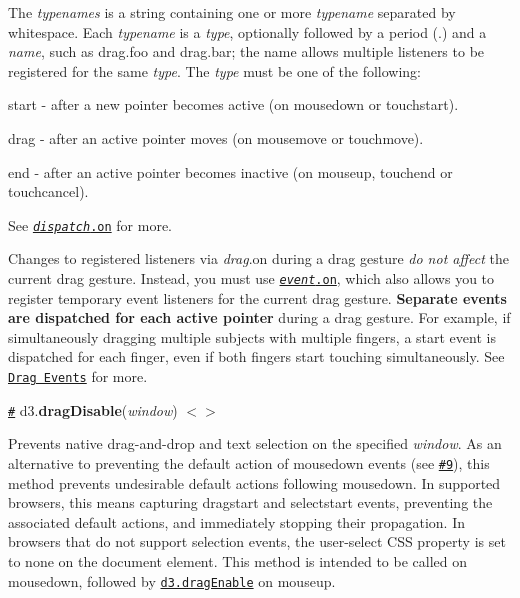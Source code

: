 The {\itshape typenames} is a string containing one or more {\itshape typename} separated by whitespace. Each {\itshape typename} is a {\itshape type}, optionally followed by a period ({\ttfamily .}) and a {\itshape name}, such as {\ttfamily drag.\+foo} and {\ttfamily drag.\+bar}; the name allows multiple listeners to be registered for the same {\itshape type}. The {\itshape type} must be one of the following\+:


\begin{DoxyItemize}
\item {\ttfamily start} -\/ after a new pointer becomes active (on mousedown or touchstart).
\item {\ttfamily drag} -\/ after an active pointer moves (on mousemove or touchmove).
\item {\ttfamily end} -\/ after an active pointer becomes inactive (on mouseup, touchend or touchcancel).
\end{DoxyItemize}

See \href{https://github.com/d3/d3-dispatch#dispatch_on}{\tt {\itshape dispatch}.on} for more.

Changes to registered listeners via {\itshape drag}.on during a drag gesture {\itshape do not affect} the current drag gesture. Instead, you must use \href{#event_on}{\tt {\itshape event}.on}, which also allows you to register temporary event listeners for the current drag gesture. {\bfseries Separate events are dispatched for each active pointer} during a drag gesture. For example, if simultaneously dragging multiple subjects with multiple fingers, a start event is dispatched for each finger, even if both fingers start touching simultaneously. See \href{#drag-events}{\tt Drag Events} for more.

\href{#dragDisable}{\tt \#} d3.{\bfseries drag\+Disable}({\itshape window}) \href{https://github.com/d3/d3-drag/blob/master/src/nodrag.js#L4}{\tt $<$$>$}

Prevents native drag-\/and-\/drop and text selection on the specified {\itshape window}. As an alternative to preventing the default action of mousedown events (see \href{https://github.com/d3/d3-drag/issues/9}{\tt \#9}), this method prevents undesirable default actions following mousedown. In supported browsers, this means capturing dragstart and selectstart events, preventing the associated default actions, and immediately stopping their propagation. In browsers that do not support selection events, the user-\/select C\+SS property is set to none on the document element. This method is intended to be called on mousedown, followed by \href{#dragEnable}{\tt d3.\+drag\+Enable} on mouseup.

